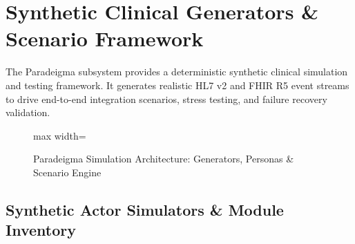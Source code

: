 
\chapter{Synthetic Clinical Generators \& Scenario Framework}
\label{chap:paradeigma_generators}

The Paradeigma subsystem provides a deterministic synthetic clinical simulation and testing framework. It generates realistic HL7 v2 and FHIR R5 event streams to drive end-to-end integration scenarios, stress testing, and failure recovery validation.

\begin{figure}[htbp]
    \centering
    \begin{adjustbox}{max width=\textwidth}
        
    \end{adjustbox}
    \caption{Paradeigma Simulation Architecture: Generators, Personas \& Scenario Engine}
    \label{fig:paradeigma_generators_architecture}
\end{figure}

\section{Synthetic Actor Simulators \& Module Inventory}

